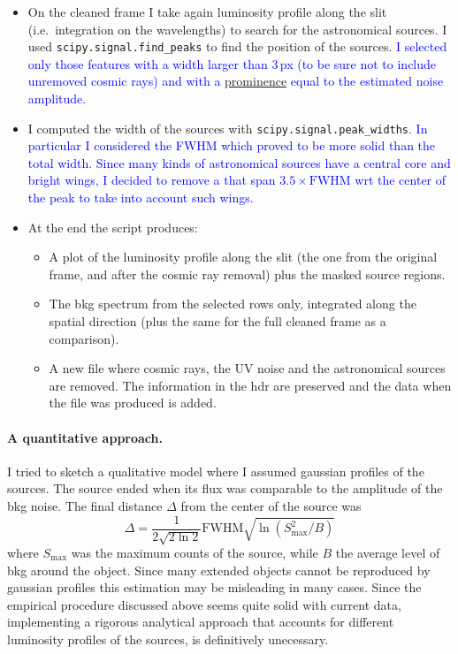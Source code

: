 \documentclass{article}
\newcommand{\arbitrario}[1]{\textcolor{blue}{#1}}
\begin{document}
\begin{itemize}
	\item On the cleaned frame I take again luminosity profile along the slit (i.e.\ integration on the wavelengths) to search for the astronomical sources. I used \texttt{scipy.signal.find\_peaks} to find the position of the sources. \arbitrario{I selected only those features with a width larger than 3\,px (to be sure not to include unremoved cosmic rays) and with a \href{https://en.wikipedia.org/wiki/Topographic_prominence}{prominence} equal to the estimated noise amplitude.}
	
	\item I computed the width of the sources with \texttt{scipy.signal.peak\_widths}. \arbitrario{In particular I considered the FWHM which proved to be more solid than the total width. Since many kinds of astronomical sources have a central core and bright wings, I decided to remove a that span $3.5\times\text{FWHM}$ wrt the center of the peak to take into account such wings.}	
	
	\item At the end the script produces:
	\begin{itemize}
		\item A plot of the luminosity profile along the slit (the one from the original frame, and after the cosmic ray removal) plus the masked source regions.
		\item The bkg spectrum from the selected rows only, integrated along the spatial direction (plus the same for the full cleaned frame as a comparison).
		\item A new file where cosmic rays, the UV noise and the astronomical sources are removed. The information in the hdr are preserved and the data when the file was produced is added.
	\end{itemize}
\end{itemize}


\paragraph{A quantitative approach.} I tried to sketch a qualitative model where I assumed gaussian profiles of the sources. The source ended when its flux was comparable to the amplitude of the bkg noise. The final distance $\Delta$ from the center of the source was
\[\Delta = \frac{1}{2\sqrt{2\ln 2}}\text{FWHM}\sqrt{\ln(S_\text{max}^2/B)}   \]
where $S_\text{max}$ was the maximum counts of the source, while $B$ the average level of bkg around the object. Since many extended objects cannot be reproduced by gaussian profiles this estimation may be misleading in many cases. Since the empirical procedure discussed above seems quite solid with current data, implementing a rigorous analytical approach that accounts for different luminosity profiles of the sources, is definitively unecessary.
\end{document}
